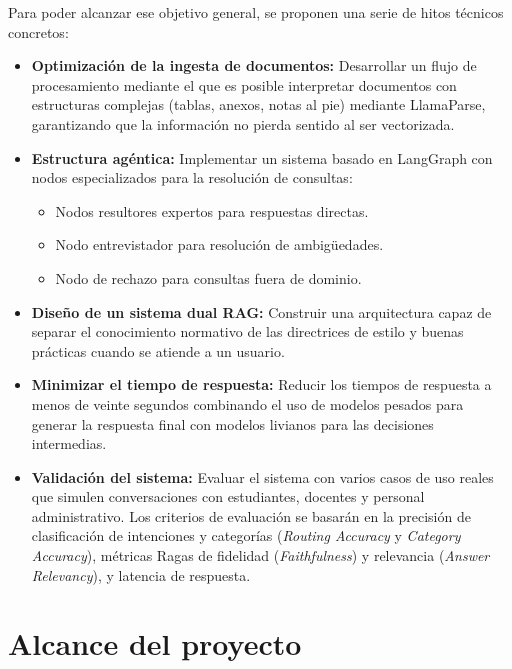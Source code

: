 \documentclass[12pt,a4paper,oneside]{report}
\begin{document}
Para poder alcanzar ese objetivo general, se proponen una serie de hitos técnicos concretos:

\begin{itemize}
    \item \textbf{Optimización de la ingesta de documentos:} Desarrollar un flujo de procesamiento mediante el que es posible interpretar documentos con estructuras complejas (tablas, anexos, notas al pie) mediante LlamaParse, garantizando que la información no pierda sentido al ser vectorizada.
    \item \textbf{Estructura agéntica:} Implementar un sistema basado en LangGraph con nodos especializados para la resolución de consultas:
          \begin{itemize}
              \item Nodos resultores expertos para respuestas directas.
              \item Nodo entrevistador para resolución de ambigüedades.
              \item Nodo de rechazo para consultas fuera de dominio.
          \end{itemize}

    \item \textbf{Diseño de un sistema dual RAG:} Construir una arquitectura capaz de separar el conocimiento normativo de las directrices de estilo y buenas prácticas cuando se atiende a un usuario.

    \item \textbf{Minimizar el tiempo de respuesta:} Reducir los tiempos de respuesta a menos de veinte segundos combinando el uso de modelos pesados para generar la respuesta final con modelos livianos para las decisiones intermedias.

    \item \textbf{Validación del sistema:}  Evaluar el sistema con varios casos de uso reales que simulen conversaciones con estudiantes, docentes y personal administrativo. Los criterios de evaluación se basarán en la precisión de clasificación de intenciones y categorías (\textit{Routing Accuracy} y \textit{Category Accuracy}), métricas Ragas de fidelidad (\textit{Faithfulness}) y relevancia (\textit{Answer Relevancy}), y latencia de respuesta.
\end{itemize}

\section{Alcance del proyecto}
\end{document}
